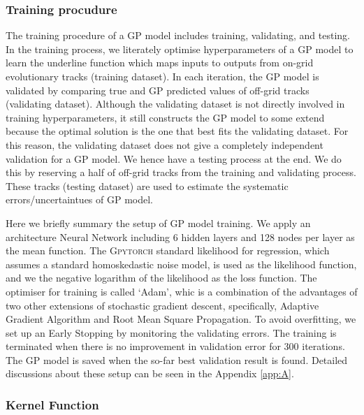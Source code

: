 \subsubsection{Training procudure}

The training procedure of a GP model includes training, validating, and testing. 
In the training process, we literately optimise hyperparameters of a GP model to learn the underline function which maps inputs to outputs from on-grid evolutionary tracks (training dataset). In each iteration, the GP model is validated by comparing true and GP predicted values of off-grid tracks (validating dataset). Although the validating dataset is not directly involved in training hyperparameters, it still constructs the GP model to some extend because the optimal solution is the one that best fits the validating dataset. For this reason, the validating dataset does not give a completely independent validation for a GP model. We hence have a testing process at the end. We do this by reserving a half of off-grid tracks from the training and validating process. These tracks (testing dataset) are used to estimate the systematic errors/uncertaintues of GP model. 

Here we briefly summary the setup of GP model training. We apply an architecture Neural Network including 6 hidden layers and 128 nodes per layer as the mean function. The \textsc{Gpytorch} standard likelihood for regression, which assumes a standard homoskedastic noise model, is used as the likelihood function, and we the negative logarithm of the likelihood as the loss function. The optimiser for training is called `Adam', whic is a combination of the advantages of two other extensions of stochastic gradient descent, specifically, Adaptive Gradient Algorithm and Root Mean Square Propagation. 
%
To avoid overfitting, we set up an Early Stopping by monitoring the validating errors. The training is terminated when there is no improvement in validation error for 300 iterations. The GP model is saved when the so-far best validation result is found. Detailed discussions about these setup can be seen in the Appendix \ref{app:A}. 

\subsubsection{Kernel Function}\label{sec:kernel}

